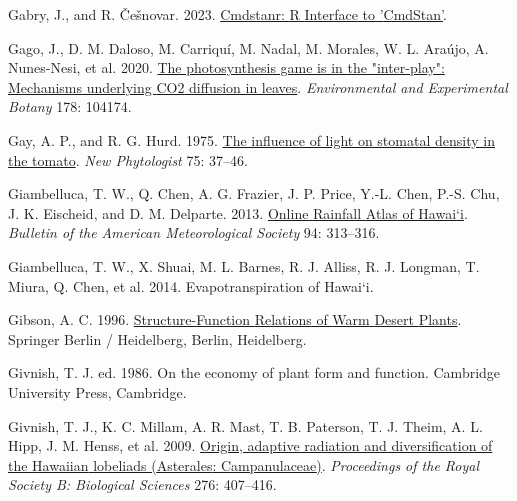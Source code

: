 \documentclass[
  letterpaper,
  DIV=11,
  numbers=noendperiod]{scrartcl}
\newlength{\cslhangindent}
\newlength{\cslentryspacingunit} %
\newenvironment{CSLReferences}[2] %
 {%
  \setlength{\parindent}{0pt}
  \ifodd #1
  \let\oldpar\par
  \def\par{\hangindent=\cslhangindent\oldpar}
  \fi
  \setlength{\parskip}{#2\cslentryspacingunit}
 }%
 {}
\begin{document}
\begin{CSLReferences}{1}{0}
\leavevmode{}%
Gabry, J., and R. Češnovar. 2023.
\href{https://mc-stan.org/cmdstanr,\%20https://discourse.mc-stan.org}{Cmdstanr:
{R} {Interface} to '{CmdStan}'}.

\leavevmode{}%
Gago, J., D. M. Daloso, M. Carriquí, M. Nadal, M. Morales, W. L. Araújo,
A. Nunes-Nesi, et al. 2020.
\href{https://doi.org/10.1016/j.envexpbot.2020.104174}{The
photosynthesis game is in the "inter-play": {Mechanisms} underlying
{CO2} diffusion in leaves}. \emph{Environmental and Experimental Botany}
178: 104174.

\leavevmode{}%
Gay, A. P., and R. G. Hurd. 1975.
\href{https://doi.org/10.1111/j.1469-8137.1975.tb01368.x}{The influence
of light on stomatal density in the tomato}. \emph{New Phytologist} 75:
37--46.

\leavevmode{}%
Giambelluca, T. W., Q. Chen, A. G. Frazier, J. P. Price, Y.-L. Chen,
P.-S. Chu, J. K. Eischeid, and D. M. Delparte. 2013.
\href{https://doi.org/10.1175/BAMS-D-11-00228.1}{Online {Rainfall}
{Atlas} of {Hawai}`i}. \emph{Bulletin of the American Meteorological
Society} 94: 313--316.

\leavevmode{}%
Giambelluca, T. W., X. Shuai, M. L. Barnes, R. J. Alliss, R. J. Longman,
T. Miura, Q. Chen, et al. 2014. Evapotranspiration of {Hawai}`i.

\leavevmode{}%
Gibson, A. C. 1996.
\href{http://public.eblib.com/choice/PublicFullRecord.aspx?p=6495247}{Structure-{Function}
{Relations} of {Warm} {Desert} {Plants}}. Springer Berlin / Heidelberg,
Berlin, Heidelberg.

\leavevmode{}%
Givnish, T. J. ed. 1986. On the economy of plant form and function.
Cambridge University Press, Cambridge.

\leavevmode{}%
Givnish, T. J., K. C. Millam, A. R. Mast, T. B. Paterson, T. J. Theim,
A. L. Hipp, J. M. Henss, et al. 2009.
\href{https://doi.org/10.1098/rspb.2008.1204}{Origin, adaptive radiation
and diversification of the {Hawaiian} lobeliads ({Asterales}:
{Campanulaceae})}. \emph{Proceedings of the Royal Society B: Biological
Sciences} 276: 407--416.


\end{CSLReferences}
\end{document}
